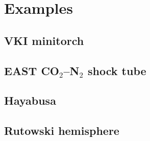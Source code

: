 \chapter{Examples}
\label{chap:examples}

\section{VKI minitorch}


\section{EAST CO$_2$--N$_2$ shock tube}


\section{Hayabusa}


\section{Rutowski hemisphere}

